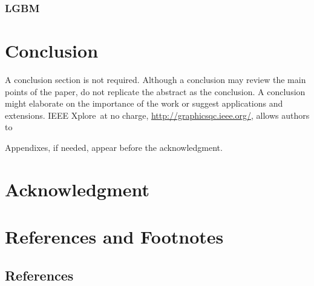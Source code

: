 \documentclass[journal,twoside,web]{ieeecolor}
\begin{document}
\subsubsection{LGBM}





\section{Conclusion}
A conclusion section is not required. Although a conclusion may review the 
main points of the paper, do not replicate the abstract as the conclusion. A 
conclusion might elaborate on the importance of the work or suggest 
applications and extensions. 
IEEE Xplore\textregistered\ at no charge, \underline{http://graphicsqc.ieee.org/}, allows authors to 

\appendices

Appendixes, if needed, appear before the acknowledgment.

\section*{Acknowledgment}



\section*{References and Footnotes}

\subsection{References}

\nocite{*}







\end{document}
